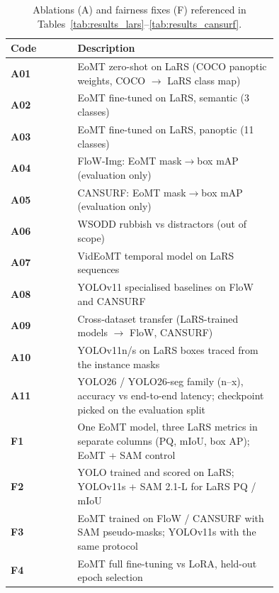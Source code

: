 \begin{table}[t]
\centering
\small
\begin{tabular}{lp{0.75\linewidth}}
\toprule
Code & Description \\
\midrule
\raisebox{\ht\strutbox}{\hypertarget{abl:A01}{}}\textbf{A01} & EoMT zero-shot on LaRS (COCO panoptic weights, COCO $\to$ LaRS class map) \\
\raisebox{\ht\strutbox}{\hypertarget{abl:A02}{}}\textbf{A02} & EoMT fine-tuned on LaRS, semantic (3 classes) \\
\raisebox{\ht\strutbox}{\hypertarget{abl:A03}{}}\textbf{A03} & EoMT fine-tuned on LaRS, panoptic (11 classes) \\
\raisebox{\ht\strutbox}{\hypertarget{abl:A04}{}}\textbf{A04} & FloW-Img: EoMT mask$\to$box mAP (evaluation only) \\
\raisebox{\ht\strutbox}{\hypertarget{abl:A05}{}}\textbf{A05} & CANSURF: EoMT mask$\to$box mAP (evaluation only) \\
\raisebox{\ht\strutbox}{\hypertarget{abl:A06}{}}\textbf{A06} & WSODD rubbish vs distractors (out of scope) \\
\raisebox{\ht\strutbox}{\hypertarget{abl:A07}{}}\textbf{A07} & VidEoMT temporal model on LaRS sequences \\
\raisebox{\ht\strutbox}{\hypertarget{abl:A08}{}}\textbf{A08} & YOLOv11 specialised baselines on FloW and CANSURF \\
\raisebox{\ht\strutbox}{\hypertarget{abl:A09}{}}\textbf{A09} & Cross-dataset transfer (LaRS-trained models $\to$ FloW, CANSURF) \\
\raisebox{\ht\strutbox}{\hypertarget{abl:A10}{}}\textbf{A10} & YOLOv11n/s on LaRS boxes traced from the instance masks \\
\raisebox{\ht\strutbox}{\hypertarget{abl:A11}{}}\textbf{A11} & YOLO26 / YOLO26-seg family (n--x), accuracy vs end-to-end latency; checkpoint picked on the evaluation split \\
\midrule
\raisebox{\ht\strutbox}{\hypertarget{abl:F1}{}}\textbf{F1} & One EoMT model, three LaRS metrics in separate columns (PQ, mIoU, box AP); EoMT + SAM control \\
\raisebox{\ht\strutbox}{\hypertarget{abl:F2}{}}\textbf{F2} & YOLO trained and scored on LaRS; YOLOv11s + SAM 2.1-L for LaRS PQ / mIoU \\
\raisebox{\ht\strutbox}{\hypertarget{abl:F3}{}}\textbf{F3} & EoMT trained on FloW / CANSURF with SAM pseudo-masks; YOLOv11s with the same protocol \\
\raisebox{\ht\strutbox}{\hypertarget{abl:F4}{}}\textbf{F4} & EoMT full fine-tuning vs LoRA, held-out epoch selection \\
\bottomrule
\end{tabular}
\caption{Ablations (A) and fairness fixes (F) referenced in Tables~\ref{tab:results_lars}--\ref{tab:results_cansurf}.}
\label{tab:ablations}
\end{table}

